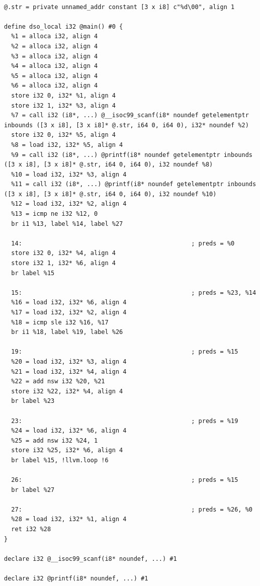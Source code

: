 \documentclass[UTF8,a4paper,10pt]{ctexart}
\begin{document}
\begin{verbatim}

@.str = private unnamed_addr constant [3 x i8] c"%d\00", align 1

define dso_local i32 @main() #0 {
  %1 = alloca i32, align 4
  %2 = alloca i32, align 4
  %3 = alloca i32, align 4
  %4 = alloca i32, align 4
  %5 = alloca i32, align 4
  %6 = alloca i32, align 4
  store i32 0, i32* %1, align 4
  store i32 1, i32* %3, align 4
  %7 = call i32 (i8*, ...) @__isoc99_scanf(i8* noundef getelementptr inbounds ([3 x i8], [3 x i8]* @.str, i64 0, i64 0), i32* noundef %2)
  store i32 0, i32* %5, align 4
  %8 = load i32, i32* %5, align 4
  %9 = call i32 (i8*, ...) @printf(i8* noundef getelementptr inbounds ([3 x i8], [3 x i8]* @.str, i64 0, i64 0), i32 noundef %8)
  %10 = load i32, i32* %3, align 4
  %11 = call i32 (i8*, ...) @printf(i8* noundef getelementptr inbounds ([3 x i8], [3 x i8]* @.str, i64 0, i64 0), i32 noundef %10)
  %12 = load i32, i32* %2, align 4
  %13 = icmp ne i32 %12, 0
  br i1 %13, label %14, label %27

  14:                                               ; preds = %0
  store i32 0, i32* %4, align 4
  store i32 1, i32* %6, align 4
  br label %15

  15:                                               ; preds = %23, %14
  %16 = load i32, i32* %6, align 4
  %17 = load i32, i32* %2, align 4
  %18 = icmp sle i32 %16, %17
  br i1 %18, label %19, label %26

  19:                                               ; preds = %15
  %20 = load i32, i32* %3, align 4
  %21 = load i32, i32* %4, align 4
  %22 = add nsw i32 %20, %21
  store i32 %22, i32* %4, align 4
  br label %23

  23:                                               ; preds = %19
  %24 = load i32, i32* %6, align 4
  %25 = add nsw i32 %24, 1
  store i32 %25, i32* %6, align 4
  br label %15, !llvm.loop !6

  26:                                               ; preds = %15
  br label %27

  27:                                               ; preds = %26, %0
  %28 = load i32, i32* %1, align 4
  ret i32 %28
}

declare i32 @__isoc99_scanf(i8* noundef, ...) #1

declare i32 @printf(i8* noundef, ...) #1

\end{verbatim}
\end{document}
